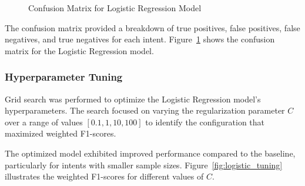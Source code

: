 \begin{figure}[h]
\begin{minipage}[c]{0.47\textwidth}
                    \caption{Confusion Matrix for Logistic Regression Model}
                    \label{fig:logistic_cm}
                \end{minipage}
            \end{figure}

            The confusion matrix provided a breakdown of true positives, false positives, false negatives, and true negatives for each intent. Figure~\ref{fig:logistic_cm} shows the confusion matrix for the Logistic Regression model.

        \subsubsection{Hyperparameter Tuning \\}

            Grid search was performed to optimize the Logistic Regression model's hyperparameters. The search focused on varying the regularization parameter \( C \) over a range of values \([0.1, 1, 10, 100]\) to identify the configuration that maximized weighted F1-scores.


            The optimized model exhibited improved performance compared to the baseline, particularly for intents with smaller sample sizes. Figure~\ref{fig:logistic_tuning} illustrates the weighted F1-scores for different values of \( C \).
            
            
            \clearpage %
            
